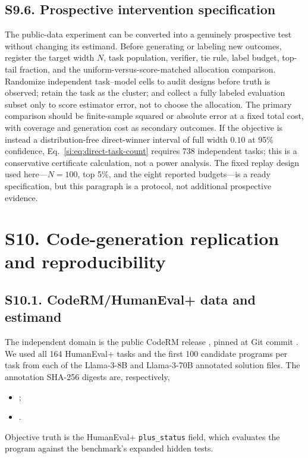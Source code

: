 \documentclass[10pt,twocolumn]{article}
\begin{document}
\subsection*{S9.6. Prospective intervention specification}

The public-data experiment can be converted into a genuinely prospective test without changing its estimand. Before generating or labeling new outcomes, register the target width $N$, task population, verifier, tie rule, label budget, top-tail fraction, and the uniform-versus-score-matched allocation comparison. Randomize independent task--model cells to audit designs before truth is observed; retain the task as the cluster; and collect a fully labeled evaluation subset only to score estimator error, not to choose the allocation. The primary comparison should be finite-sample squared or absolute error at a fixed total cost, with coverage and generation cost as secondary outcomes. If the objective is instead a distribution-free direct-winner interval of full width $0.10$ at 95\% confidence, Eq.~\ref{si:eq:direct-task-count} requires 738 independent tasks; this is a conservative certificate calculation, not a power analysis. The fixed replay design used here---$N=100$, top 5\%, and the eight reported budgets---is a ready specification, but this paragraph is a protocol, not additional prospective evidence.

\section*{S10. Code-generation replication and reproducibility}

\subsection*{S10.1. CodeRM/HumanEval+ data and estimand}

The independent domain is the public CodeRM release \citep{ma2025}, pinned at Git commit \texttt{}. We used all 164 HumanEval+ tasks and the first 100 candidate programs per task from each of the Llama-3-8B and Llama-3-70B annotated solution files. The annotation SHA-256 digests are, respectively,
\begin{itemize}
\item \texttt{};
\item \texttt{}.
\end{itemize}
Objective truth is the HumanEval+ \texttt{plus\_status} field, which evaluates the program against the benchmark's expanded hidden tests.
\end{document}
